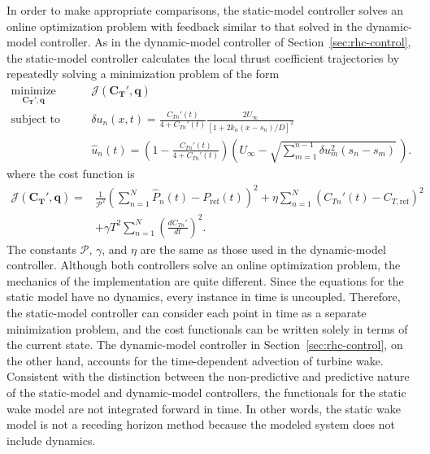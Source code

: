 In order to make appropriate comparisons, the static-model controller solves an online optimization problem with feedback similar to that solved in the dynamic-model controller. As in the dynamic-model controller of Section~\ref{sec:rhc-control}, the static-model controller calculates the local thrust coefficient trajectories by repeatedly solving a minimization problem of the form
\begin{align}
\label{eq:minimize_J_static}
\underset{\mathbf{C_{T}'}, \mathbf{q}}{\text{minimize}} \qquad & \mathcal{J}(\mathbf{C_T'}, \mathbf{q} ) \\
\label{eq:constraint1_static}
\text{subject to} \qquad & \delta u_n(x,t)  = \frac{C_{Tn}'(t)}{4 + C_{Tn}'(t)}\frac{2 U_\infty}{\left[1 + 2k_n (x - s_n)/D\right]^2}\\
\label{eq:constraint2}
& \hat{u}_n(t) = \left(1- \frac{C_{Tn}'(t)}{4 + C_{Tn}'(t)}\right)\left( U_\infty - \sqrt{  \sum_{m=1}^{n-1} \delta u_m^2(s_n-s_m) } \, \right).
\end{align}
where the cost function is
\begin{equation}
\begin{split}
 \mathcal{J}(\mathbf{C_T'}, \mathbf{q} ) =& \frac{1}{\mathcal{P}^2}\left( \sum_{n=1}^N \hat{P}_n(t) - P_{\text{ref}}(t)\right)^2 + \eta \sum_{n=1}^N\left( C_{Tn}'(t) - C_{T, \text{ref}} \right)^2 \\
 &+ \gamma T^2 \sum_{n=1}^N\left( \frac{d C_{Tn}'}{dt}  \right)^2.
 \end{split}
\end{equation}
The constants $\mathcal{P}$, $\gamma$, and $\eta$ are the same as those used in the dynamic-model controller. Although both controllers solve an online optimization problem, the mechanics of the implementation are quite different. Since the equations for the static model have no dynamics, every instance in time is uncoupled. Therefore, the static-model controller can consider each point in time as a separate minimization problem, and the cost functionals can be written solely in terms of the current state. The dynamic-model controller in Section~\ref{sec:rhc-control}, on the other hand, accounts for the time-dependent advection of turbine wake.  Consistent with the distinction between the non-predictive and predictive nature of the static-model and dynamic-model controllers, the functionals for the static wake model are not integrated forward in time. In other words, the static wake model is not a receding horizon method because the modeled system does not include dynamics.

